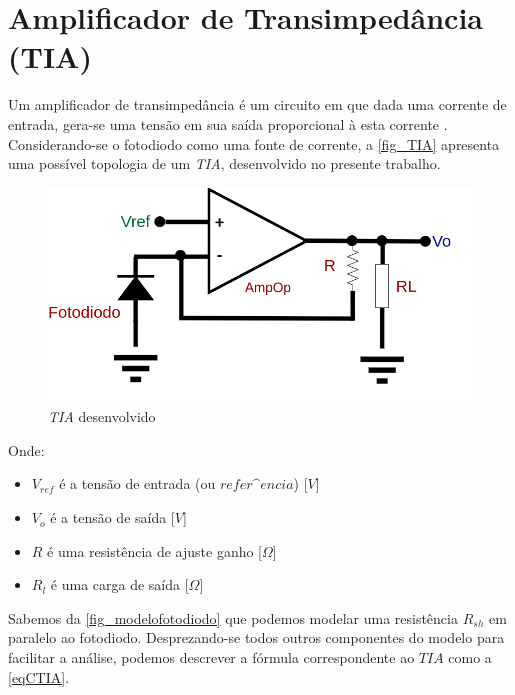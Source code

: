 \section{Amplificador de Transimped\^ancia (TIA)}
\label{section:TIA}

Um amplificador de transimped\^ancia \'e um circuito em que dada uma corrente de entrada, gera-se uma tens\~ao em sua sa\'ida proporcional \`a esta corrente \cite{RazaviFundM}. Considerando-se o fotodiodo como uma fonte de corrente, a \autoref{fig_TIA} apresenta uma poss\'ivel topologia de um \emph{TIA}, desenvolvido no presente trabalho.

\begin{figure}[htb]
	\caption{\label{fig_TIA}\emph{TIA} desenvolvido}
	\begin{center}
	    \includegraphics[scale=0.3]{Circuitos/TIA.png}
	\end{center}
\end{figure}

Onde:

\begin{itemize}
    \item $V_{ref}$ \'e a tens\~ao de entrada (ou $refer\^encia$) [$V$]
    \item $V_o$ \'e a tens\~ao de sa\'ida [$V$]
    \item $R$ \'e uma resist\^encia de ajuste ganho [$\Omega$]
    \item $R_l$ \'e uma carga de sa\'ida [$\Omega$]
\end{itemize}

Sabemos da \autoref{fig_modelofotodiodo} que podemos modelar uma resist\^encia $R_{sh}$ em paralelo ao fotodiodo. Desprezando-se todos outros componentes do modelo para facilitar a an\'alise, podemos descrever a f\'ormula correspondente ao $TIA$ como a \autoref{eqCTIA}.

